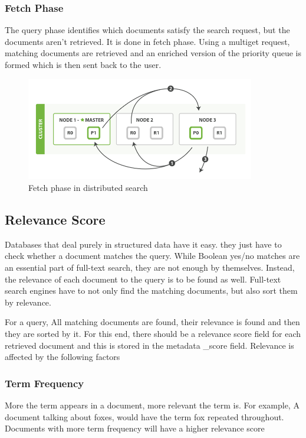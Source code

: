 \documentclass[12pt]{article}
\begin{document}
			\subsubsection{Fetch Phase}
			The query phase identifies which documents satisfy the search request, but the documents aren't retrieved. It is done in fetch phase. Using a multiget request, matching documents are retrieved and an enriched version of the priority queue is formed which is then sent back to the user.
				\begin{figure}[ht]
					\centering\includegraphics[width=10cm]{images/fetch_phase}
					\caption{Fetch phase in distributed search}
				\end{figure}

		\subsection{Relevance Score}
			Databases that deal purely in structured data have it easy. they just have to check whether a document matches the query. While Boolean yes/no matches are an essential part of full-text search, they are not enough by themselves. Instead, the relevance of each document to the query is to be found as well. Full-text search engines have to not only find the matching documents, but also sort them by relevance.

			For a query, All matching documents are found, their relevance is found and then they are sorted by it. For this end, there should be a relevance score field for each retrieved document and this is stored in the metadata \_score field. Relevance is affected by the following factors

			\subsubsection{Term Frequency}
				More the term appears in a document, more relevant the term is. For example, A document talking about foxes, would have the term fox repeated throughout. Documents with more term frequency will have a higher relevance score
\end{document}

